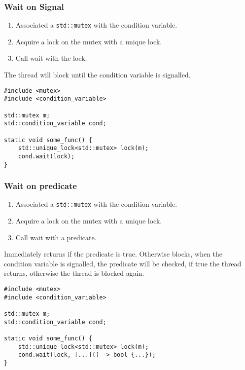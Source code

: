 \begin{minipage}{.48\textwidth}
  \subsubsection{Wait on Signal}
  \begin{enumerate}
    \item Associated a \texttt{std::mutex} with the condition variable.
    \item Acquire a lock on the mutex with a unique lock.
    \item Call wait with the lock.
  \end{enumerate}
  The thread will block until the condition variable is signalled.
  \begin{verbatim}
#include <mutex>
#include <condition_variable>

std::mutex m;
std::condition_variable cond;

static void some_func() {
    std::unique_lock<std::mutex> lock(m);
    cond.wait(lock);
}
  \end{verbatim}
\end{minipage}
\hfill
\vline
\hfill
\begin{minipage}{.48\textwidth}
  \subsubsection{Wait on predicate}
  \begin{enumerate}
    \item Associated a \texttt{std::mutex} with the condition variable.
    \item Acquire a lock on the mutex with a unique lock.
    \item Call wait with a predicate.
  \end{enumerate}
  Immediately returns if the predicate is true. Otherwise blocks, when the condition variable is 
  signalled, the predicate will be checked, if true the thread returns, otherwise the thread 
  is blocked again.
  \begin{verbatim}
#include <mutex>
#include <condition_variable>

std::mutex m;
std::condition_variable cond;

static void some_func() {
    std::unique_lock<std::mutex> lock(m);
    cond.wait(lock, [...]() -> bool {...});
}
  \end{verbatim} 
\end{minipage}


